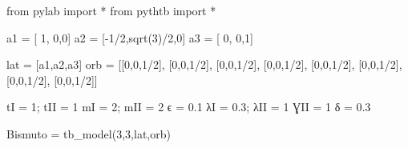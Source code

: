 \documentclass[
  letterpaper,
  DIV=11,
  numbers=noendperiod]{scrreprt}
\newenvironment{Shaded}{\begin{snugshade}}{\end{snugshade}}
\newcommand{\DecValTok}[1]{\textcolor[rgb]{0.68,0.00,0.00}{#1}}
\newcommand{\FloatTok}[1]{\textcolor[rgb]{0.68,0.00,0.00}{#1}}
\newcommand{\ImportTok}[1]{\textcolor[rgb]{0.00,0.46,0.62}{#1}}
\newcommand{\NormalTok}[1]{\textcolor[rgb]{0.00,0.23,0.31}{#1}}
\newcommand{\OperatorTok}[1]{\textcolor[rgb]{0.37,0.37,0.37}{#1}}
\begin{document}
\begin{Shaded}
\begin{Highlighting}[]
\ImportTok{from}\NormalTok{ pylab }\ImportTok{import} \OperatorTok{*}
\ImportTok{from}\NormalTok{ pythtb }\ImportTok{import} \OperatorTok{*}

\NormalTok{a1 }\OperatorTok{=}\NormalTok{ [   }\DecValTok{1}\NormalTok{,        }\DecValTok{0}\NormalTok{,}\DecValTok{0}\NormalTok{]}
\NormalTok{a2 }\OperatorTok{=}\NormalTok{ [}\OperatorTok{{-}}\DecValTok{1}\OperatorTok{/}\DecValTok{2}\NormalTok{,sqrt(}\DecValTok{3}\NormalTok{)}\OperatorTok{/}\DecValTok{2}\NormalTok{,}\DecValTok{0}\NormalTok{]}
\NormalTok{a3 }\OperatorTok{=}\NormalTok{ [   }\DecValTok{0}\NormalTok{,        }\DecValTok{0}\NormalTok{,}\DecValTok{1}\NormalTok{]}

\NormalTok{lat }\OperatorTok{=}\NormalTok{ [a1,a2,a3]}
\NormalTok{orb }\OperatorTok{=}\NormalTok{ [[}\DecValTok{0}\NormalTok{,}\DecValTok{0}\NormalTok{,}\DecValTok{1}\OperatorTok{/}\DecValTok{2}\NormalTok{],}
\NormalTok{       [}\DecValTok{0}\NormalTok{,}\DecValTok{0}\NormalTok{,}\DecValTok{1}\OperatorTok{/}\DecValTok{2}\NormalTok{],}
\NormalTok{       [}\DecValTok{0}\NormalTok{,}\DecValTok{0}\NormalTok{,}\DecValTok{1}\OperatorTok{/}\DecValTok{2}\NormalTok{],}
\NormalTok{       [}\DecValTok{0}\NormalTok{,}\DecValTok{0}\NormalTok{,}\DecValTok{1}\OperatorTok{/}\DecValTok{2}\NormalTok{],}
\NormalTok{       [}\DecValTok{0}\NormalTok{,}\DecValTok{0}\NormalTok{,}\DecValTok{1}\OperatorTok{/}\DecValTok{2}\NormalTok{],}
\NormalTok{       [}\DecValTok{0}\NormalTok{,}\DecValTok{0}\NormalTok{,}\DecValTok{1}\OperatorTok{/}\DecValTok{2}\NormalTok{],}
\NormalTok{       [}\DecValTok{0}\NormalTok{,}\DecValTok{0}\NormalTok{,}\DecValTok{1}\OperatorTok{/}\DecValTok{2}\NormalTok{],}
\NormalTok{       [}\DecValTok{0}\NormalTok{,}\DecValTok{0}\NormalTok{,}\DecValTok{1}\OperatorTok{/}\DecValTok{2}\NormalTok{]]}

\NormalTok{tI  }\OperatorTok{=} \DecValTok{1}\OperatorTok{;}\NormalTok{ tII }\OperatorTok{=} \DecValTok{1}
\NormalTok{mI  }\OperatorTok{=} \DecValTok{2}\OperatorTok{;}\NormalTok{ mII }\OperatorTok{=} \DecValTok{2}
\NormalTok{ϵ }\OperatorTok{=} \FloatTok{0.1}
\NormalTok{λI }\OperatorTok{=} \FloatTok{0.3}\OperatorTok{;}\NormalTok{ λII }\OperatorTok{=} \DecValTok{1}
\NormalTok{ƔII }\OperatorTok{=} \DecValTok{1}
\NormalTok{δ }\OperatorTok{=} \FloatTok{0.3}

\NormalTok{Bismuto }\OperatorTok{=}\NormalTok{ tb\_model(}\DecValTok{3}\NormalTok{,}\DecValTok{3}\NormalTok{,lat,orb)}
\end{Highlighting}
\end{Shaded}
\end{document}
